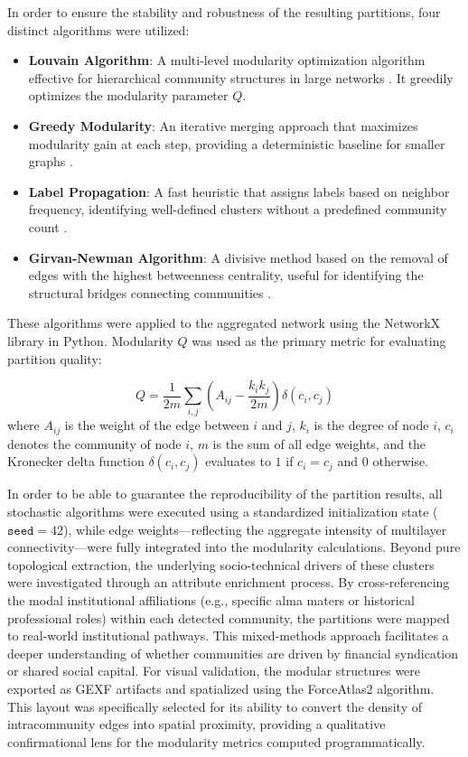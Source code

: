 \documentclass[conference]{IEEEtran}
\begin{document}
In order to ensure the stability and robustness of the resulting partitions, four distinct algorithms were utilized:
\begin{itemize}
    \item \textbf{Louvain Algorithm}: A multi-level modularity optimization algorithm effective for hierarchical community structures in large networks \cite{blondel2008fast}. It greedily optimizes the modularity parameter $Q$.
    \item \textbf{Greedy Modularity}: An iterative merging approach that maximizes modularity gain at each step, providing a deterministic baseline for smaller graphs \cite{clauset2004finding}. 
    \item \textbf{Label Propagation}: A fast heuristic that assigns labels based on neighbor frequency, identifying well-defined clusters without a predefined community count \cite{raghavan2007near}.
    \item \textbf{Girvan-Newman Algorithm}: A divisive method based on the removal of edges with the highest betweenness centrality, useful for identifying the structural bridges connecting communities \cite{newman2004finding}. 
\end{itemize}

These algorithms were applied to the aggregated network using the NetworkX library in Python. Modularity $Q$ was used as the primary metric for evaluating partition quality:

\[
Q = \frac{1}{2m}\sum_{i,j} \left( A_{ij} - \frac{k_i k_j}{2m} \right) \delta(c_i, c_j)
\]
where $A_{ij}$ is the weight of the edge between $i$ and $j$, $k_i$ is the degree of node $i$, $c_i$ denotes the community of node $i$, $m$ is the sum of all edge weights, and the Kronecker delta function $\delta(c_i, c_j)$ evaluates to $1$ if $c_i = c_j$ and $0$ otherwise.

In order to be able to guarantee the reproducibility of the partition results, all stochastic algorithms were executed using a standardized initialization state ($\texttt{seed}=42$), while edge weights—reflecting the aggregate intensity of multilayer connectivity—were fully integrated into the modularity calculations. Beyond pure topological extraction, the underlying socio-technical drivers of these clusters were investigated through an attribute enrichment process. By cross-referencing the modal institutional affiliations (e.g., specific alma maters or historical professional roles) within each detected community, the partitions were mapped to real-world institutional pathways. This mixed-methods approach facilitates a deeper understanding of whether communities are driven by financial syndication or shared social capital. For visual validation, the modular structures were exported as GEXF artifacts and spatialized using the ForceAtlas2 algorithm. This layout was specifically selected for its ability to convert the density of intracommunity edges into spatial proximity, providing a qualitative confirmational lens for the modularity metrics computed programmatically.
\end{document}
